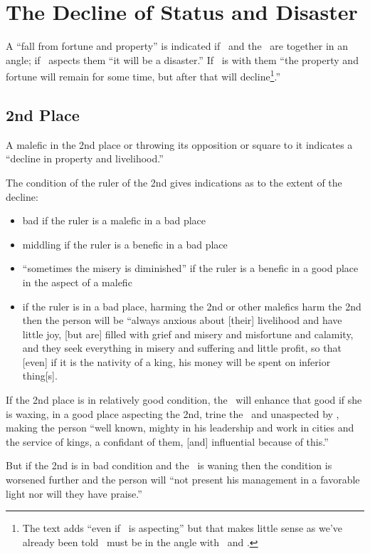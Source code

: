 \section{The Decline of Status and Disaster}

A ``fall from fortune and property'' is indicated if \Saturn\, and the \Moon\, are together in an angle; if \Mars\, aspects them ``it will be a disaster.'' If \Jupiter\, is with them ``the property and fortune will remain for some time, but after that will decline\footnote{The text adds ``even if \Jupiter\, is aspecting'' but that makes little sense as we've already been told \Jupiter\, must be in the angle with \Saturn\, and \Mars.}.''

\subsection{2nd Place}
A malefic in the 2nd place or throwing its opposition or square to it indicates a ``decline in property and livelihood.''

The condition of the ruler of the 2nd gives indications as to the extent of the decline:
\begin{itemize}[topsep=0em,itemsep=0em]
\item bad if the ruler is a malefic in a bad place
\item middling if the ruler is a benefic in a bad place
\item ``sometimes the misery is diminished'' if the ruler is a benefic in a good place in the aspect of a malefic
\item if the ruler is in a bad place, harming the 2nd or other malefics harm the 2nd then the person will be ``always anxious about [their] livelihood and have little joy, [but are] filled with grief and misery and misfortune and calamity, and they seek everything in misery and suffering and little profit, so that [even] if it is the nativity of a king, his money will be spent on inferior thing[s].
\end{itemize}

If the 2nd place is in relatively good condition, the \Moon\, will enhance that good if she is waxing, in a good place aspecting the 2nd, trine the \Sun\, and unaspected by \Mars, making the person ``well known, mighty in his leadership and work in cities and the service of kings, a confidant of them, [and] influential because of this.''

But if the 2nd is in bad condition and the \Moon\, is waning then the condition is worsened further and the person will ``not present his management in a favorable light nor will they have praise.''

